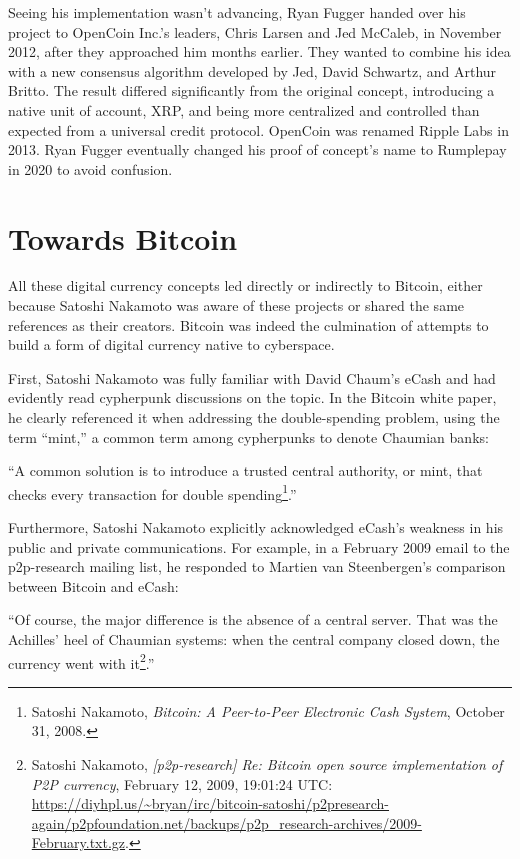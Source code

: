 \documentclass[
  a5paper,
  smalldemyvopaper,10pt,twoside,onecolumn,openright,extrafontsizes,hidelinks]{memoir}
\begin{document}
Seeing his implementation wasn't advancing, Ryan Fugger handed over his
project to OpenCoin Inc.'s leaders, Chris Larsen and Jed McCaleb, in
November 2012, after they approached him months earlier. They wanted to
combine his idea with a new consensus algorithm developed by Jed, David
Schwartz, and Arthur Britto. The result differed significantly from the
original concept, introducing a native unit of account, XRP, and being
more centralized and controlled than expected from a universal credit
protocol. OpenCoin was renamed Ripple Labs in 2013. Ryan Fugger
eventually changed his proof of concept's name to Rumplepay in 2020 to
avoid confusion.

\section*{Towards Bitcoin}\label{towards-bitcoin}


All these digital currency concepts led directly or indirectly to
Bitcoin, either because Satoshi Nakamoto was aware of these projects or
shared the same references as their creators. Bitcoin was indeed the
culmination of attempts to build a form of digital currency native to
cyberspace.

First, Satoshi Nakamoto was fully familiar with David Chaum's eCash and
had evidently read cypherpunk discussions on the topic. In the Bitcoin
white paper, he clearly referenced it when addressing the
double-spending problem, using the term ``mint,'' a common term among
cypherpunks to denote Chaumian banks:

``A common solution is to introduce a trusted central authority, or
mint, that checks every transaction for double spending\footnote{Satoshi
  Nakamoto, \emph{Bitcoin: A Peer-to-Peer Electronic Cash System},
  October 31, 2008.}.''

Furthermore, Satoshi Nakamoto explicitly acknowledged eCash's weakness
in his public and private communications. For example, in a February
2009 email to the p2p-research mailing list, he responded to Martien van
Steenbergen's comparison between Bitcoin and eCash:

``Of course, the major difference is the absence of a central server.
That was the Achilles' heel of Chaumian systems: when the central
company closed down, the currency went with it\footnote{Satoshi
  Nakamoto, \emph{{[}p2p-research{]} Re: Bitcoin open source
  implementation of P2P currency}, February 12, 2009, 19:01:24 UTC:
  \url{https://diyhpl.us/~bryan/irc/bitcoin-satoshi/p2presearch-again/p2pfoundation.net/backups/p2p_research-archives/2009-February.txt.gz}.}.''
\end{document}
